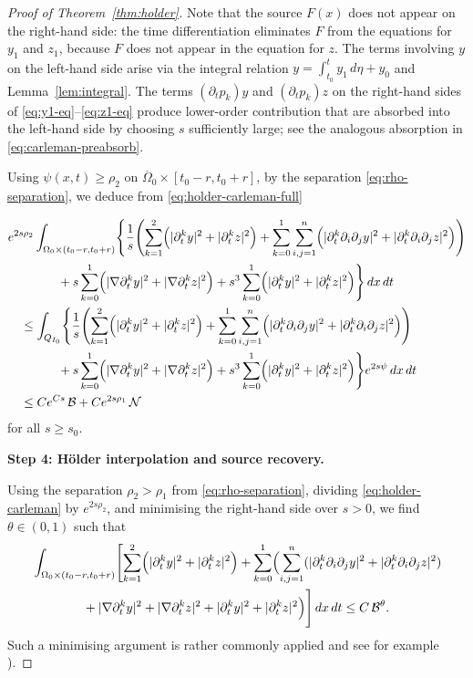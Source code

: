 \documentclass[12pt]{amsart}
\theoremstyle{plain}
\theoremstyle{definition}
\theoremstyle{remark}
\newcommand{\p}{\partial}
\newcommand{\Om}{\Omega}
\begin{document}
\begin{proof}[Proof of Theorem~\ref{thm:holder}]
Note that the source $F(x)$ does not appear on the right-hand side:
the time differentiation eliminates $F$ from the equations for $y_1$ and $z_1$,
because $F$ does not appear in the equation for $z$. The terms involving $y$ on the left-hand side arise via the integral relation $y=\int_{t_0}^t y_1\,d\eta+y_0$ and Lemma~\ref{lem:integral}. The terms $(\p_t p_k)y$ and $(\p_t p_k)z$ on the right-hand sides of \eqref{eq:y1-eq}--\eqref{eq:z1-eq} produce lower-order 
contribution that are absorbed into the left-hand side by choosing $s$ sufficiently large; see the analogous absorption in \eqref{eq:carleman-preabsorb}.

Using $\psi(x,t)\ge\rho_2$ on
$\overline{\Om}_0\times[t_0-r,t_0+r]$, by the separation
\eqref{eq:rho-separation}, we deduce from \eqref{eq:holder-carleman-full}

\begin{align}
&e^{2s\rho_2}\int_{\Om_0\times(t_0-r,t_0+r)}
\Biggl\{\frac{1}{s}\Biggl(
\sum_{k=1}^2\Bigl(|\p_t^k y|^2+|\p_t^k z|^2\Bigr)
+\sum_{k=0}^1\sum_{i,j=1}^n
\Bigl(|\p_t^k\p_i\p_j y|^2+|\p_t^k\p_i\p_j z|^2\Bigr)
\Biggr)\notag\\
&\qquad\qquad
+s\sum_{k=0}^1\Bigl(|\nabla\p_t^k y|^2+|\nabla\p_t^k z|^2\Bigr)
+s^3\sum_{k=0}^1\Bigl(|\p_t^k y|^2+|\p_t^k z|^2\Bigr)
\Biggr\}\,dx\,dt
\notag\\
&\quad\le
\int_{Q_{I_0}}\Biggl\{\frac{1}{s}\Biggl(
\sum_{k=1}^2\Bigl(|\p_t^k y|^2+|\p_t^k z|^2\Bigr)
+\sum_{k=0}^1\sum_{i,j=1}^n
\Bigl(|\p_t^k\p_i\p_j y|^2+|\p_t^k\p_i\p_j z|^2\Bigr)
\Biggr)\notag\\
&\qquad\qquad
+s\sum_{k=0}^1\Bigl(|\nabla\p_t^k y|^2+|\nabla\p_t^k z|^2\Bigr)
+s^3\sum_{k=0}^1\Bigl(|\p_t^k y|^2+|\p_t^k z|^2\Bigr)
\Biggr\}e^{2s\psi}\,dx\,dt
\notag\\
&\quad\le
Ce^{Cs}\,\mathcal{B}+Ce^{2s\rho_1}\,\mathcal{N}
\label{eq:holder-carleman}
\end{align}
for all $s\ge s_0$.


\medskip
\noindent\textbf{Step 4: H\"older interpolation and source recovery.}

Using the separation $\rho_2>\rho_1$ from \eqref{eq:rho-separation},
dividing \eqref{eq:holder-carleman} by $e^{2s\rho_2}$,
and minimising the right-hand side over $s>0$, 
we find $\theta\in(0,1)$ such that
\begin{align}
&\int_{\Om_0\times(t_0-r,t_0+r)}
\Biggl[\sum_{k=1}^2\Bigl(|\p_t^k y|^2+|\p_t^k z|^2\Bigr)
+\sum_{k=0}^1\Bigl(\sum_{i,j=1}^n
(|\p_t^k\p_i\p_j y|^2+|\p_t^k\p_i\p_j z|^2)\notag\\
&\qquad\qquad
+|\nabla\p_t^k y|^2+|\nabla\p_t^k z|^2
+|\p_t^k y|^2+|\p_t^k z|^2\Bigr)\Biggr]\,dx\,dt
\le C\,\mathcal{B}^{\theta}.
\label{eq:holder-interp}
\end{align}
Such a minimising argument is rather commonly applied and see for 
example \cite[Proof of Theorem~3.3.1]{Y25}).


\end{proof}
\end{document}
